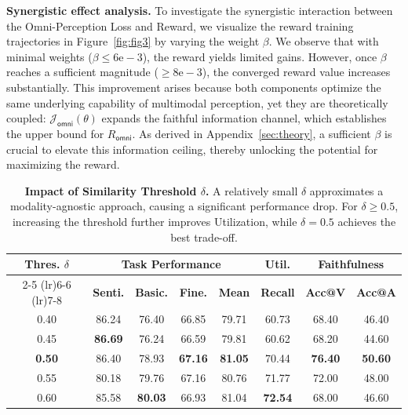 \documentclass{article}
\theoremstyle{plain}
\theoremstyle{definition}
\theoremstyle{remark}
\begin{document}
\noindent\textbf{Synergistic effect analysis.}
To investigate the synergistic interaction between the Omni-Perception Loss and Reward, we visualize the reward training trajectories in Figure~\ref{fig:fig3} by varying the weight $\beta$. We observe that with minimal weights ($\beta \le 6\mathrm{e}{-}3$), the reward yields limited gains. However, once $\beta$ reaches a sufficient magnitude ($\ge 8\mathrm{e}{-}3$), the converged reward value increases substantially. This improvement arises because both components optimize the same underlying capability of multimodal perception, yet they are theoretically coupled: $\mathcal{J}_\mathsf{omni}(\theta)$ expands the faithful information channel, which establishes the upper bound for $R_\mathsf{omni}$. As derived in Appendix~\ref{sec:theory}, a sufficient $\beta$ is crucial to elevate this information ceiling, thereby unlocking the potential for maximizing the reward.


\begin{table}[t]
\centering

\fontsize{8}{10}\selectfont 
\renewcommand{\arraystretch}{1.2}
\setlength{\tabcolsep}{3.2pt}

\caption{\textbf{Impact of Similarity Threshold $\delta$.} A relatively small $\delta$ approximates a modality-agnostic approach, causing a significant performance drop. For $\delta \ge 0.5$, increasing the threshold further improves Utilization, while $\delta=0.5$ achieves the best trade-off.}
\label{tab:ablation_delta}

\begin{tabular}{c c c c c c c c}
    \toprule

    \multirow{2}{*}{\textbf{Thres. $\delta$}} 
    & \multicolumn{4}{c}{\textbf{Task Performance}} 
    & \textbf{Util.} 
    & \multicolumn{2}{c}{\textbf{Faithfulness}} \\
    \cmidrule(lr){2-5}
    \cmidrule(lr){6-6}
    \cmidrule(lr){7-8}
    
    & \textbf{Senti.} 
    & \textbf{Basic.} 
    & \textbf{Fine.} 
    & \textbf{Mean} 
    & \textbf{Recall} 
    & \textbf{Acc@V} 
    & \textbf{Acc@A} \\
    \midrule
    
    0.40 & 86.24 & 76.40 & 66.85 & 79.71 & 60.73 & 68.40 & 46.40 \\
    0.45 & \textbf{86.69} & 76.24 & 66.59 & 79.81 & 60.62 & 68.20 & 44.60 \\
    
    \rowcolor{tabhighlight} 
    \textbf{0.50} & 86.40 & 78.93 & \textbf{67.16} & \textbf{81.05} & 70.44 & \textbf{76.40} & \textbf{50.60} \\
    
    0.55 & 80.18 & 79.76 & 67.16 & 80.76 & 71.77 & 72.00 & 48.00 \\
    0.60 & 85.58 & \textbf{80.03} & 66.93 & 81.04 & \textbf{72.54} & 68.00 & 46.60 \\
    
    \bottomrule
\end{tabular}
\vspace{-5mm}
\end{table}
\end{document}
